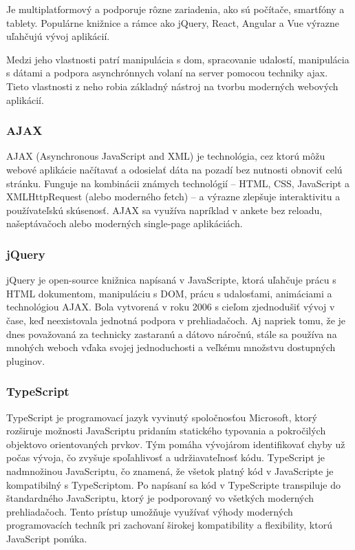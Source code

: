 Je multiplatformový a podporuje rôzne zariadenia, ako sú počítače, smartfóny a tablety. Populárne knižnice a rámce ako jQuery, React, Angular a Vue výrazne uľahčujú vývoj aplikácií.

Medzi jeho vlastnosti patrí manipulácia s \acrfull{dom}, spracovanie udalostí, manipulácia s dátami a podpora asynchrónnych volaní na server pomocou techniky \acrfull{ajax}.
 Tieto vlastnosti z neho robia základný nástroj na tvorbu moderných webových aplikácií.\cite{JavaScript}
 \subsubsection*{AJAX}
 AJAX (Asynchronous JavaScript and XML) je technológia, cez ktorú môžu webové aplikácie načítavať a odosielať dáta na pozadí bez nutnosti obnoviť celú stránku.
  Funguje na kombinácii známych technológií – HTML, CSS, JavaScript a XMLHttpRequest (alebo moderného fetch) – a výrazne zlepšuje interaktivitu a používateľskú skúsenosť. 
 AJAX sa využíva napríklad v ankete bez reloadu, našeptávačoch alebo moderných single-page aplikáciách.\cite{ajax}
\subsubsection*{jQuery}
jQuery je open-source knižnica napísaná v JavaScripte, ktorá uľahčuje prácu s HTML dokumentom, manipuláciu s DOM, prácu s udalosťami, animáciami a technológiou AJAX.
 Bola vytvorená v roku 2006 s cieľom zjednodušiť vývoj v čase, keď neexistovala jednotná podpora v prehliadačoch.
  Aj napriek tomu, že je dnes považovaná za technicky zastaranú a dátovo náročnú, stále sa používa na mnohých weboch vďaka svojej jednoduchosti a veľkému množstvu dostupných pluginov.\cite{jquery}


 \subsubsection*{TypeScript}
TypeScript je programovací jazyk vyvinutý spoločnosťou Microsoft, ktorý rozširuje možnosti JavaScriptu pridaním statického typovania a pokročilých objektovo orientovaných prvkov.
 Tým pomáha vývojárom identifikovať chyby už počas vývoja, čo zvyšuje spoľahlivosť a udržiavateľnosť kódu.
  TypeScript je nadmnožinou JavaScriptu, čo znamená, že všetok platný kód v JavaScripte je kompatibilný s TypeScriptom.
   Po napísaní sa kód v TypeScripte transpiluje do štandardného JavaScriptu, ktorý je podporovaný vo všetkých moderných prehliadačoch. 
   Tento prístup umožňuje využívať výhody moderných programovacích techník pri zachovaní širokej kompatibility a flexibility, ktorú JavaScript ponúka.\cite{TypeScript} 
